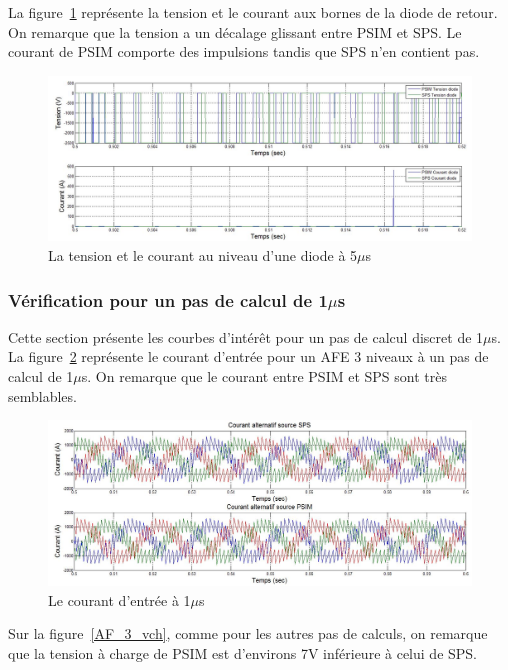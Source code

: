 \documentclass[11pt,letterpaper,final]{report}
\begin{document}
La figure~\ref{AF_3_DIODE5} représente la tension et le courant aux bornes de la diode de retour. On remarque que la tension a un décalage glissant entre PSIM et SPS. Le courant de PSIM comporte des impulsions tandis que SPS n'en contient pas.

\begin{figure}[htb]
\centering
\includegraphics[scale=0.5]{Fig/AFE3LEVEL/5u/DIODE.jpg}
\caption{La tension et le courant au niveau d'une diode à 5$\mu$s}
\label{AF_3_DIODE5}
\end{figure}

\clearpage
\subsubsection{Vérification pour un pas de calcul de 1$\mu$s}
Cette section présente les courbes d'intérêt pour un pas de calcul discret de 1$\mu$s. La figure~\ref{AF_3_cou} représente le courant d'entrée pour un AFE 3 niveaux à un pas de calcul de 1$\mu$s. On remarque que le courant entre PSIM et SPS sont très semblables.

\begin{figure}[htb]
\centering
\includegraphics[scale=0.5]{Fig/AFE3LEVEL/1u/cour_al.jpg}
\caption{Le courant d'entrée à 1$\mu$s}
\label{AF_3_cou}
\end{figure}
Sur la figure~\ref{AF_3_vch}, comme pour les autres pas de calculs, on remarque que la tension à charge de PSIM est d'environs 7V inférieure à celui de SPS.
\end{document}
